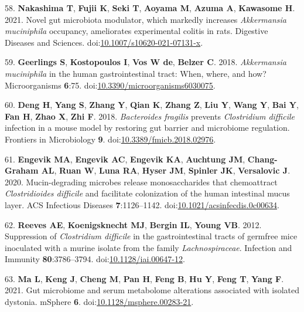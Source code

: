 \documentclass[
  12pt,
]{article}
\newenvironment{cslreferences}%
  {}%
  {\par}
\begin{document}
\begin{cslreferences}
\leavevmode\hypertarget{ref-Nakashima2021}{}%
58. \textbf{Nakashima T}, \textbf{Fujii K}, \textbf{Seki T},
\textbf{Aoyama M}, \textbf{Azuma A}, \textbf{Kawasome H}. 2021. Novel
gut microbiota modulator, which markedly increases \emph{Akkermansia
muciniphila} occupancy, ameliorates experimental colitis in rats.
Digestive Diseases and Sciences.
doi:\href{https://doi.org/10.1007/s10620-021-07131-x}{10.1007/s10620-021-07131-x}.

\leavevmode\hypertarget{ref-Geerlings2018}{}%
59. \textbf{Geerlings S}, \textbf{Kostopoulos I}, \textbf{Vos W de},
\textbf{Belzer C}. 2018. \emph{Akkermansia muciniphila} in the human
gastrointestinal tract: When, where, and how? Microorganisms
\textbf{6}:75.
doi:\href{https://doi.org/10.3390/microorganisms6030075}{10.3390/microorganisms6030075}.

\leavevmode\hypertarget{ref-Deng2018}{}%
60. \textbf{Deng H}, \textbf{Yang S}, \textbf{Zhang Y}, \textbf{Qian K},
\textbf{Zhang Z}, \textbf{Liu Y}, \textbf{Wang Y}, \textbf{Bai Y},
\textbf{Fan H}, \textbf{Zhao X}, \textbf{Zhi F}. 2018. \emph{Bacteroides
fragilis} prevents \emph{Clostridium difficile} infection in a mouse
model by restoring gut barrier and microbiome regulation. Frontiers in
Microbiology \textbf{9}.
doi:\href{https://doi.org/10.3389/fmicb.2018.02976}{10.3389/fmicb.2018.02976}.

\leavevmode\hypertarget{ref-Engevik2020}{}%
61. \textbf{Engevik MA}, \textbf{Engevik AC}, \textbf{Engevik KA},
\textbf{Auchtung JM}, \textbf{Chang-Graham AL}, \textbf{Ruan W},
\textbf{Luna RA}, \textbf{Hyser JM}, \textbf{Spinler JK},
\textbf{Versalovic J}. 2020. Mucin-degrading microbes release
monosaccharides that chemoattract \emph{Clostridioides difficile} and
facilitate colonization of the human intestinal mucus layer. ACS
Infectious Diseases \textbf{7}:1126--1142.
doi:\href{https://doi.org/10.1021/acsinfecdis.0c00634}{10.1021/acsinfecdis.0c00634}.

\leavevmode\hypertarget{ref-Reeves2012}{}%
62. \textbf{Reeves AE}, \textbf{Koenigsknecht MJ}, \textbf{Bergin IL},
\textbf{Young VB}. 2012. Suppression of \emph{Clostridium difficile} in
the gastrointestinal tracts of germfree mice inoculated with a murine
isolate from the family \emph{Lachnospiraceae}. Infection and Immunity
\textbf{80}:3786--3794.
doi:\href{https://doi.org/10.1128/iai.00647-12}{10.1128/iai.00647-12}.

\leavevmode\hypertarget{ref-Ma2021}{}%
63. \textbf{Ma L}, \textbf{Keng J}, \textbf{Cheng M}, \textbf{Pan H},
\textbf{Feng B}, \textbf{Hu Y}, \textbf{Feng T}, \textbf{Yang F}. 2021.
Gut microbiome and serum metabolome alterations associated with isolated
dystonia. mSphere \textbf{6}.
doi:\href{https://doi.org/10.1128/msphere.00283-21}{10.1128/msphere.00283-21}.


\end{cslreferences}
\end{document}
